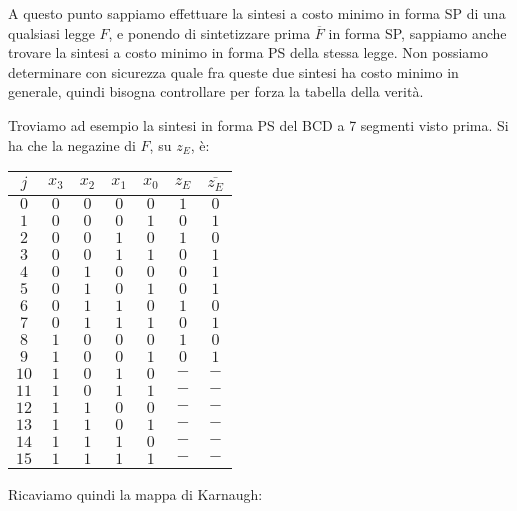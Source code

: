\documentclass[a4paper,11pt]{article}
\begin{document}
A questo punto sappiamo effettuare la sintesi a costo minimo in forma SP di una qualsiasi legge $F$, e ponendo di sintetizzare prima $\overline{F}$ in forma SP, sappiamo anche trovare la sintesi a costo minimo in forma PS della stessa legge.
Non possiamo determinare con sicurezza quale fra queste due sintesi ha costo minimo in generale, quindi bisogna controllare per forza la tabella della verità.

Troviamo ad esempio la sintesi in forma PS del BCD a 7 segmenti visto prima.
Si ha che la negazine di $F$, su $z_E$, è:

\begin{table}[H]
	\center 
	\begin{tabular} { c | c c c c | c | c }
		$j$ & $x_3$ & $x_2$ & $x_1$ & $x_0$ & $z_E$ & $\overline{z_E}$ \\
		\hline
		$0$ & $0$ & $0$ & $0$ & $0$ & $1$ & $0$ \\
		$1$ & $0$ & $0$ & $0$ & $1$ & $0$ & $1$ \\
		$2$ & $0$ & $0$ & $1$ & $0$ & $1$ & $0$ \\
		$3$ & $0$ & $0$ & $1$ & $1$ & $0$ & $1$ \\

		$4$ & $0$ & $1$ & $0$ & $0$ & $0$ & $1$ \\
		$5$ & $0$ & $1$ & $0$ & $1$ & $0$ & $1$ \\
		$6$ & $0$ & $1$ & $1$ & $0$ & $1$ & $0$ \\
		$7$ & $0$ & $1$ & $1$ & $1$ & $0$ & $1$ \\
	
		$8$ & $1$ & $0$ & $0$ & $0$ & $1$ & $0$ \\
		$9$ & $1$ & $0$ & $0$ & $1$ & $0$ & $1$ \\
		$10$ & $1$ & $0$ & $1$ & $0$ & $-$ & $-$ \\
		$11$ & $1$ & $0$ & $1$ & $1$ & $-$ & $-$ \\

		$12$ & $1$ & $1$ & $0$ & $0$ & $-$ & $-$ \\
		$13$ & $1$ & $1$ & $0$ & $1$ & $-$ & $-$ \\
		$14$ & $1$ & $1$ & $1$ & $0$ & $-$ & $-$ \\
		$15$ & $1$ & $1$ & $1$ & $1$ & $-$ & $-$ \\
	\end{tabular}
\end{table}

Ricaviamo quindi la mappa di Karnaugh:
\end{document}
